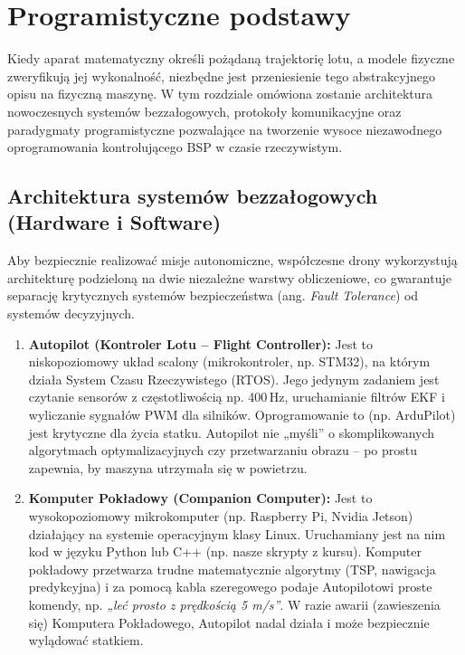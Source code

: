 \chapter{Programistyczne podstawy}

Kiedy aparat matematyczny określi pożądaną trajektorię lotu, a modele fizyczne zweryfikują jej wykonalność, niezbędne jest przeniesienie tego abstrakcyjnego opisu na fizyczną maszynę. W tym rozdziale omówiona zostanie architektura nowoczesnych systemów bezzałogowych, protokoły komunikacyjne oraz paradygmaty programistyczne pozwalające na tworzenie wysoce niezawodnego oprogramowania kontrolującego BSP w czasie rzeczywistym.

\section{Architektura systemów bezzałogowych (Hardware i Software)}

Aby bezpiecznie realizować misje autonomiczne, współczesne drony wykorzystują architekturę podzieloną na dwie niezależne warstwy obliczeniowe, co gwarantuje separację krytycznych systemów bezpieczeństwa (ang. \textit{Fault Tolerance}) od systemów decyzyjnych.

\begin{enumerate}
    \item \textbf{Autopilot (Kontroler Lotu -- Flight Controller):}
    Jest to niskopoziomowy układ scalony (mikrokontroler, np. STM32), na którym działa System Czasu Rzeczywistego (RTOS). Jego jedynym zadaniem jest czytanie sensorów z częstotliwością np. 400\,Hz, uruchamianie filtrów EKF i wyliczanie sygnałów PWM dla silników. Oprogramowanie to (np. ArduPilot) jest krytyczne dla życia statku. Autopilot nie „myśli” o skomplikowanych algorytmach optymalizacyjnych czy przetwarzaniu obrazu – po prostu zapewnia, by maszyna utrzymała się w powietrzu.

    \item \textbf{Komputer Pokładowy (Companion Computer):}
    Jest to wysokopoziomowy mikrokomputer (np. Raspberry Pi, Nvidia Jetson) działający na systemie operacyjnym klasy Linux. Uruchamiany jest na nim kod w języku Python lub C++ (np. nasze skrypty z kursu). Komputer pokładowy przetwarza trudne matematycznie algorytmy (TSP, nawigacja predykcyjna) i za pomocą kabla szeregowego podaje Autopilotowi proste komendy, np. \textit{„leć prosto z prędkością 5 m/s”}. W razie awarii (zawieszenia się) Komputera Pokładowego, Autopilot nadal działa i może bezpiecznie wylądować statkiem.
\end{enumerate}

